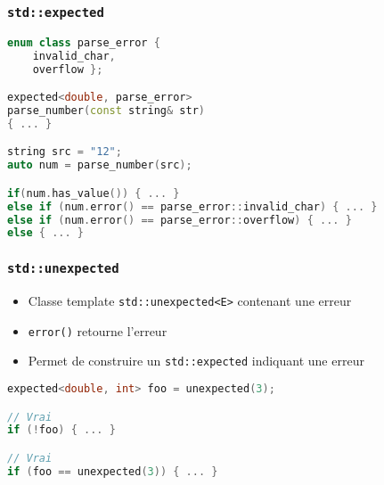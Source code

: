 \documentclass[C++.tex]{subfiles}
\begin{document}
\begin{frame}[fragile]
	\frametitle{\lstinline|std::expected|}
	\begin{lstlisting}[language=C++]
enum class parse_error { 
	invalid_char,
	overflow };

expected<double, parse_error>
parse_number(const string& str)
{ ... }

string src = "12";
auto num = parse_number(src);

if(num.has_value()) { ... }
else if (num.error() == parse_error::invalid_char) { ... }
else if (num.error() == parse_error::overflow) { ... }
else { ... }\end{lstlisting}
\end{frame}

\begin{frame}[fragile]
	\frametitle{\lstinline|std::unexpected|}
	\begin{itemize}
		\item Classe template \lstinline|std::unexpected<E>| contenant une erreur
		\item \lstinline|error()| retourne l'erreur
		\item Permet de construire un \lstinline|std::expected| indiquant une erreur
	\end{itemize}

	\begin{lstlisting}[language=C++]
expected<double, int> foo = unexpected(3);

// Vrai
if (!foo) { ... }

// Vrai
if (foo == unexpected(3)) { ... }\end{lstlisting}
\end{frame}
\end{document}
